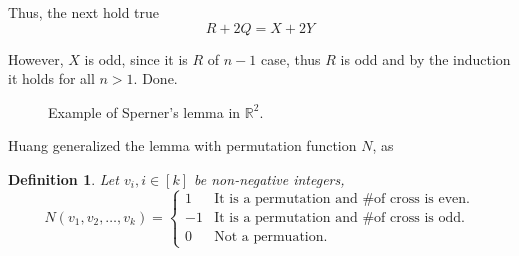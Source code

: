 \documentclass[a4paper,12pt]{article}
\newtheorem{definition}{Definition}
\begin{document}
Thus, the next hold true
\begin{equation}
    R+2Q = X + 2Y
\end{equation}

However, $X$ is odd, since it is $R$ of $n-1$ case, thus $R$ is odd and by the induction it holds for all $n>1$. Done.

\begin{figure}[!ht]
    \centering
    \caption{Example of Sperner's lemma in $\mathbb{R}^2$.}
\end{figure}

Huang generalized the lemma with permutation function $N$\cite{Huang2004ONTS},
as 

\begin{definition}
    \label{def:n_permute_function}
    Let $v_i, i \in [k]$ be non-negative integers,
    \begin{equation}
        N(v_1, v_2, \dots, v_k) = \begin{cases}
            1 &  \mbox{It is a permutation and \# of cross is even.}\\
            -1 & \mbox{It is a permutation and  \# of cross is odd.}\\
            0 & \mbox{Not a permuation.}
        \end{cases}
    \end{equation}
\end{definition}
\end{document}
